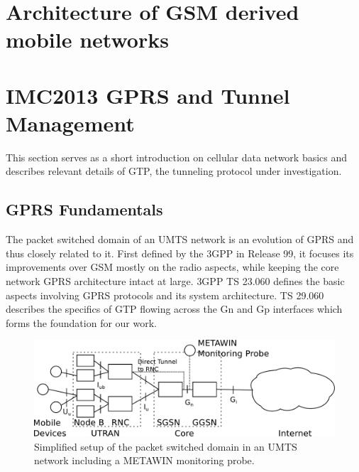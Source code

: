 %
%
\section{Architecture of GSM derived mobile networks}
\label{sec:3gpparchitecture}

\section{IMC2013 GPRS and Tunnel Management}
\label{sec:gtp-IMC}
\acresetall

This section serves as a short introduction on cellular data network basics and describes relevant details of \ac{GTP}, the tunneling protocol under investigation.


\subsection{\acs{GPRS} Fundamentals}

The packet switched domain of an \ac{UMTS} network is an evolution of \ac{GPRS} and thus closely related to it. First defined by the \ac{3GPP} in Release 99, it focuses its improvements over \ac{GSM} mostly on the radio aspects, while keeping the core network \ac{GPRS} architecture intact at large. \ac{3GPP} \ac{TS} 23.060 \cite{3gpp23.060} defines the basic aspects involving \ac{GPRS} protocols and its system architecture. \ac{TS} 29.060 \cite{3gpp29.060} describes the specifics of \ac{GTP} flowing across the Gn and Gp interfaces which forms the foundation for our work.

\begin{figure}[htbp]
	\centering
	\includegraphics[width=1.0\textwidth]{images/umts-network.pdf}
	\caption{Simplified setup of the packet switched domain in an \acs{UMTS} network including a METAWIN monitoring probe.}
	\label{c4:fig:umtsnetwork}
\end{figure}

